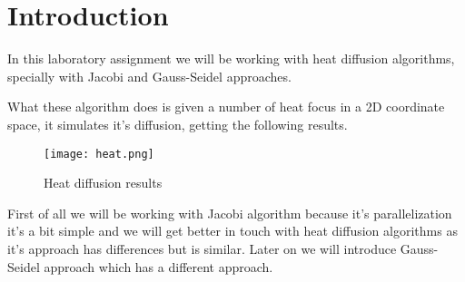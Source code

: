 \section{Introduction}
\justify
In this laboratory assignment we will be working with heat diffusion algorithms, specially with Jacobi and Gauss-Seidel approaches.

\justify
What these algorithm does is given a number of heat focus in a 2D coordinate space, it simulates it's diffusion, getting the following results.

\begin{figure}[h!]
    \centering
    \texttt{[image: heat.png]}
    \caption{Heat diffusion results}
    \label{fig:heat1}
\end{figure}

\justify
First of all we will be working with Jacobi algorithm because it's parallelization it's a bit simple and we will get better in touch with heat diffusion algorithms as it's approach has differences but is similar. Later on we will introduce Gauss-Seidel approach which has a different approach.

